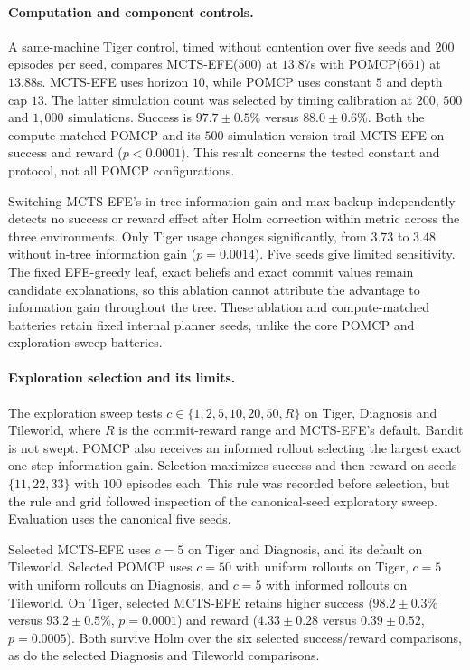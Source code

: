 \documentclass[runningheads]{llncs}
\begin{document}
\paragraph{Computation and component controls.}
A same-machine Tiger control, timed without contention over five seeds and $200$ episodes per seed, compares MCTS-EFE($500$) at $13.87$s with POMCP($661$) at $13.88$s. MCTS-EFE uses horizon $10$, while POMCP uses constant $5$ and depth cap $13$. The latter simulation count was selected by timing calibration at $200$, $500$ and $1{,}000$ simulations. Success is $97.7\pm0.5\%$ versus $88.0\pm0.6\%$. Both the compute-matched POMCP and its $500$-simulation version trail MCTS-EFE on success and reward ($p<0.0001$). This result concerns the tested constant and protocol, not all POMCP configurations.

Switching MCTS-EFE's in-tree information gain and max-backup independently detects no success or reward effect after Holm correction within metric across the three environments. Only Tiger usage changes significantly, from $3.73$ to $3.48$ without in-tree information gain ($p=0.0014$). Five seeds give limited sensitivity. The fixed EFE-greedy leaf, exact beliefs and exact commit values remain candidate explanations, so this ablation cannot attribute the advantage to information gain throughout the tree. These ablation and compute-matched batteries retain fixed internal planner seeds, unlike the core POMCP and exploration-sweep batteries.

\paragraph{Exploration selection and its limits.}
The exploration sweep tests $c\in\{1,2,5,10,\allowbreak 20,50,R\}$ on Tiger, Diagnosis and Tileworld, where $R$ is the commit-reward range and MCTS-EFE's default. Bandit is not swept. POMCP also receives an informed rollout selecting the largest exact one-step information gain. Selection maximizes success and then reward on seeds $\{11,22,33\}$ with $100$ episodes each. This rule was recorded before selection, but the rule and grid followed inspection of the canonical-seed exploratory sweep. Evaluation uses the canonical five seeds.

Selected MCTS-EFE uses $c=5$ on Tiger and Diagnosis, and its default on Tileworld. Selected POMCP uses $c=50$ with uniform rollouts on Tiger, $c=5$ with uniform rollouts on Diagnosis, and $c=5$ with informed rollouts on Tileworld. On Tiger, selected MCTS-EFE retains higher success ($98.2\pm0.3\%$ versus $93.2\pm0.5\%$, $p=0.0001$) and reward ($4.33\pm0.28$ versus $0.39\pm0.52$, $p=0.0005$). Both survive Holm over the six selected success/reward comparisons, as do the selected Diagnosis and Tileworld comparisons.
\end{document}
